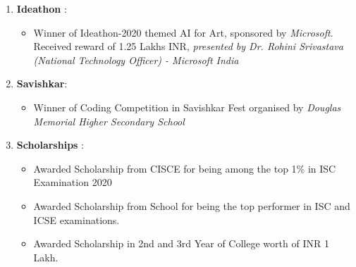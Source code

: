\documentclass[a4paper, oneside, 12pt]{article}
\makeatletter
\def\vhrulefill#1{\leavevmode\leaders\hrule\@height#1\hfill \kern\z@}
\makeatother
\begin{document}
\color[HTML]{0F00FF}{\normalsize Awards and Achievements}  \color{gray}{\vhrulefill{1.5pt}}

\vspace{2mm}
\footnotesize

\color{black}
\begin{enumerate}[label = , topsep = 0mm, partopsep = 0pt, itemsep = 1mm]
  \item
        \textbf{Ideathon }:
        \begin{itemize}[label = - , topsep = 0mm, partopsep = 0mm]
          \item Winner of Ideathon-2020 themed AI for Art, sponsored by \textit{Microsoft}. Received reward of 1.25 Lakhs INR, \textit{presented by Dr. Rohini Srivastava (National Technology Officer) - Microsoft India}
        \end{itemize}

  \item \textbf{Savishkar}:
        \begin{itemize}[label = - , topsep = 0mm, partopsep = 0mm]
          \item Winner of Coding Competition in Savishkar Fest organised by \textit{Douglas Memorial Higher Secondary School}
        \end{itemize}

  \item
        \textbf{Scholarships }:
        \begin{itemize}[label = - , topsep = 0mm, partopsep = 0mm]
          \item Awarded Scholarship from CISCE for being among the top 1\% in ISC Examination 2020
          \item Awarded Scholarship from School for being the top performer in ISC and ICSE examinations.
          \item Awarded Scholarship in 2nd and 3rd Year of College worth of INR 1 Lakh.
        \end{itemize}

\end{enumerate}

\vspace{2mm}

\color[HTML]{0F00FF}{\normalsize Contributions}  \color{gray}{\vhrulefill{1.5pt}}

\vspace{2mm}
\footnotesize
\end{document}

